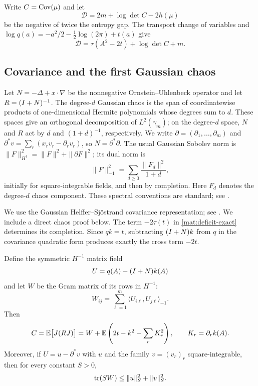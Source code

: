 Write $C=\operatorname{Cov}(\mu)$ and let
\[
 \mathscr D=2m+\log\det C-2h(\mu)
\]
be the negative of twice the entropy gap.  The transport change of variables and
$\log q(a)=-a^2/2-\frac12\log(2\pi)+t(a)$ give
\begin{equation}\label{mat:deficit-exact}
 \mathscr D=\tau(A^2-2t)+\log\det C+m.
\end{equation}

\subsection{Covariance and the first Gaussian chaos}

Let $N=-\Delta+x\cdot\nabla$ be the nonnegative Ornstein--Uhlenbeck
operator and let $R=(I+N)^{-1}$.  The degree-$d$ Gaussian chaos is
the span of coordinatewise products of one-dimensional Hermite polynomials whose
degrees sum to $d$.  These spaces give an orthogonal decomposition of
$L^2(\gamma_m)$; on the degree-$d$ space, $N$ and $R$ act by $d$ and
$(1+d)^{-1}$, respectively.
We write $\partial=(\partial_1,\ldots,\partial_m)$ and
$\partial^*v=\sum_r(x_rv_r-\partial_rv_r)$, so $N=\partial^*\partial$.
The usual Gaussian Sobolev norm is
$\|F\|_{H^1}^2=\|F\|^2+\|\partial F\|^2$; its dual norm is
\[
 \|F\|_{-1}^2=\sum_{d\ge0}\frac{\|F_d\|^2}{1+d},
\]
initially for square-integrable fields, and then by completion.
Here $F_d$ denotes the degree-$d$ chaos component.  These spectral
conventions are standard; see \cite[Section~2]{NourdinPeccati2009}.

We use the Gaussian Helffer--Sj\"ostrand covariance representation;
see \cite[Proposition~4.1(ii)]{DuerinckxOtto2020}.  We include a direct
chaos proof below.  The term $-2\tau(t)$ in \eqref{mat:deficit-exact}
determines its completion.  Since $qk=t$, subtracting $(I+N)k$ from
$q$ in the covariance quadratic form produces exactly the cross term
$-2t$.

\begin{lemma}\label{mat:covariance}
Define the symmetric $H^{-1}$ matrix field
\[
 U=q(A)-(I+N)k(A)
\]
and let $W$ be the Gram matrix of its rows in $H^{-1}$:
\[
 W_{ij}=\sum_{\ell=1}^m
       \langle U_{i\ell},U_{j\ell}\rangle_{-1}.
\]
Then
\begin{equation}\label{mat:covariance-completion}
 C=\mathbb E\bigl[J(RJ)\bigr]
   =W+\mathbb E\left(2t-k^2-\sum_r K_r^2\right),
 \qquad K_r=\partial_r k(A).
\end{equation}
Moreover, if $U=u-\partial^*v$ with $u$ and the family $v=(v_r)_r$
square-integrable, then for every constant $S>0$,
\begin{equation}\label{mat:dual-bound}
 \operatorname{tr}(SW)\le\|u\|_S^2+\|v\|_S^2.
\end{equation}
\end{lemma}

